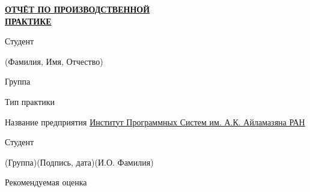 \documentclass[14pt, russian]{scrartcl}
\begin{document}
\sloppy

\begin{titlepage}
\thispagestyle{empty}

\bmstuheader

\vspace{3em}

\begin{center}
\Large {\textbf{\uline{ОТЧЁТ ПО ПРОИЗВОДСТВЕННОЙ}}} \\ {\textbf{\uline{ПРАКТИКЕ}}}
\end{center}\normalsize

\vspace{2ex}
\noindent Студент \underline{\hspace{406pt}}

\vspace{-2.1ex}
\noindent\hspace{31ex}\scriptsize{(Фамилия, Имя, Отчество)}\normalsize

\vspace{0.7ex}
\noindent Группа \underline{\hspace{50pt}}

\vspace{2ex}
\noindent Тип практики \underline{\hspace{373pt}}

\vspace{2.5ex}
\noindent Название предприятия \underline{\hspace{16pt}\footnotesize Институт Программных Систем им. А.К. Айламазяна РАН\hspace{12pt}}\normalsize

\vspace{\fill}


\noindent Студент \underline{\hspace{1.5cm}} \hfill \underline{\hspace{4cm}}\quad
\underline{\hspace{4cm}}

\vspace{-2.1ex}
\noindent\hspace{9ex}\scriptsize{(Группа)}\normalsize\hspace{170pt}\hspace{2ex}\scriptsize{(Подпись, дата)}\normalsize\hspace{30pt}\hspace{6ex}\scriptsize{(И.О. Фамилия)}\normalsize

\bigskip

\noindent Рекомендуемая оценка\hfill\underline{\hspace{195pt}}\hfill


\end{titlepage}
\end{document}

